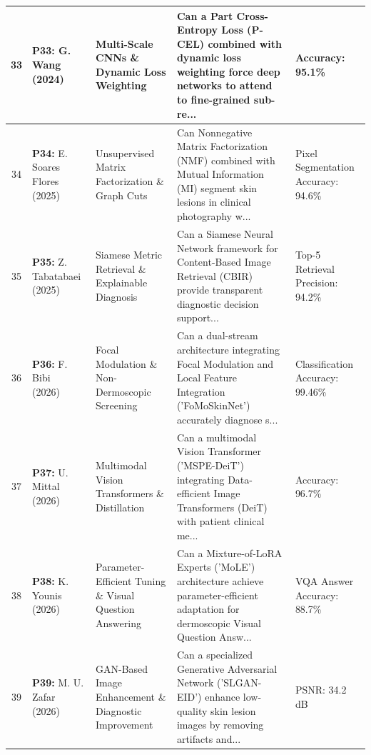 \begin{small}
\begin{longtable}{|c|p{3.2cm}|p{2.8cm}|p{5.2cm}|p{2.4cm}|}
33 & \textbf{P33:} G. Wang (2024)~\cite{10778156} & Multi-Scale CNNs \& Dynamic Loss Weighting & Can a Part Cross-Entropy Loss (P-CEL) combined with dynamic loss weighting force deep networks to attend to fine-grained sub-re... & Accuracy: 95.1\% \\ \hline
34 & \textbf{P34:} E. Soares Flores (2025)~\cite{11058930} & Unsupervised Matrix Factorization \& Graph Cuts & Can Nonnegative Matrix Factorization (NMF) combined with Mutual Information (MI) segment skin lesions in clinical photography w... & Pixel Segmentation Accuracy: 94.6\% \\ \hline
35 & \textbf{P35:} Z. Tabatabaei (2025)~\cite{11224374} & Siamese Metric Retrieval \& Explainable Diagnosis & Can a Siamese Neural Network framework for Content-Based Image Retrieval (CBIR) provide transparent diagnostic decision support... & Top-5 Retrieval Precision: 94.2\% \\ \hline
36 & \textbf{P36:} F. Bibi (2026)~\cite{11435372} & Focal Modulation \& Non-Dermoscopic Screening & Can a dual-stream architecture integrating Focal Modulation and Local Feature Integration ('FoMoSkinNet') accurately diagnose s... & Classification Accuracy: 99.46\% \\ \hline
37 & \textbf{P37:} U. Mittal (2026)~\cite{11641552} & Multimodal Vision Transformers \& Distillation & Can a multimodal Vision Transformer ('MSPE-DeiT') integrating Data-efficient Image Transformers (DeiT) with patient clinical me... & Accuracy: 96.7\% \\ \hline
38 & \textbf{P38:} K. Younis (2026)~\cite{11626860} & Parameter-Efficient Tuning \& Visual Question Answering & Can a Mixture-of-LoRA Experts ('MoLE') architecture achieve parameter-efficient adaptation for dermoscopic Visual Question Answ... & VQA Answer Accuracy: 88.7\% \\ \hline
39 & \textbf{P39:} M. U. Zafar (2026)~\cite{11598907} & GAN-Based Image Enhancement \& Diagnostic Improvement & Can a specialized Generative Adversarial Network ('SLGAN-EID') enhance low-quality skin lesion images by removing artifacts and... & PSNR: 34.2 dB \\ \hline
\end{longtable}
\end{small}
\newpage